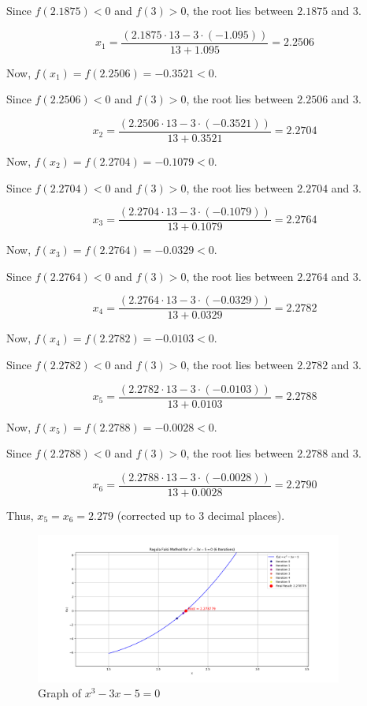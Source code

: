 \documentclass[12pt,a4paper]{article}
\begin{document}
			Since $f(2.1875) < 0$ and $f(3) > 0$, the root lies between $2.1875$ and $3$.
			
			\[
			x_1 = \frac{(2.1875 \cdot 13 - 3 \cdot (-1.095))}{13 + 1.095} = 2.2506
			\]
			
			Now, $f(x_1) = f(2.2506) = -0.3521 < 0$.
			
			Since $f(2.2506) < 0$ and $f(3) > 0$, the root lies between $2.2506$ and $3$.
			
			\[
			x_2 = \frac{(2.2506 \cdot 13 - 3 \cdot (-0.3521))}{13 + 0.3521} = 2.2704
			\]
			
			Now, $f(x_2) = f(2.2704) = -0.1079 < 0$.
			
			Since $f(2.2704) < 0$ and $f(3) > 0$, the root lies between $2.2704$ and $3$.
			
			\[
			x_3 = \frac{(2.2704 \cdot 13 - 3 \cdot (-0.1079))}{13 + 0.1079} = 2.2764
			\]
			
			Now, $f(x_3) = f(2.2764) = -0.0329 < 0$.
			
			Since $f(2.2764) < 0$ and $f(3) > 0$, the root lies between $2.2764$ and $3$.
			
			\[
			x_4 = \frac{(2.2764 \cdot 13 - 3 \cdot (-0.0329))}{13 + 0.0329} = 2.2782
			\]
			
			Now, $f(x_4) = f(2.2782) = -0.0103 < 0$.
			
			Since $f(2.2782) < 0$ and $f(3) > 0$, the root lies between $2.2782$ and $3$.
			
			\[
			x_5 = \frac{(2.2782 \cdot 13 - 3 \cdot (-0.0103))}{13 + 0.0103} = 2.2788
			\]
			
			Now, $f(x_5) = f(2.2788) = -0.0028 < 0$.
			
			Since $f(2.2788) < 0$ and $f(3) > 0$, the root lies between $2.2788$ and $3$.
			
			\[
			x_6 = \frac{(2.2788 \cdot 13 - 3 \cdot (-0.0028))}{13 + 0.0028} = 2.2790
			\]
			
			Thus, $x_5 = x_6 = 2.279$ (corrected up to 3 decimal places).
			
			\begin{figure}[h]
				\centering
				\includegraphics[width=0.9\textwidth]{regula_falsi_ex2.png} %
				\caption{Graph of $x^3-3x-5=0$}
				\label{fig:your_label_here}
			\end{figure} 
\end{document}
